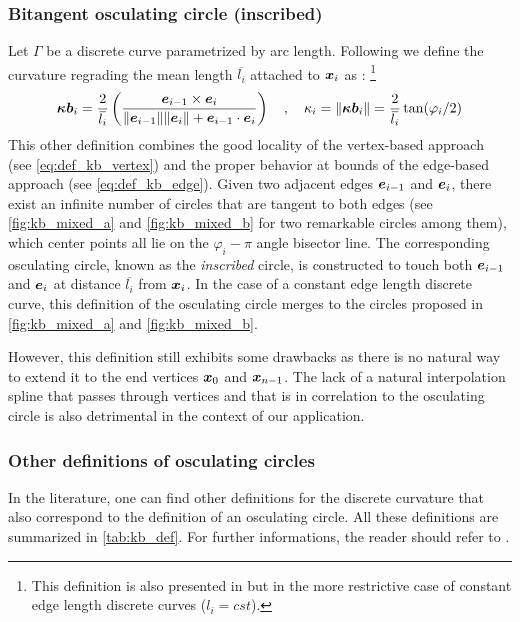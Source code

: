 \subsubsection{Bitangent osculating circle (inscribed)} \label{sec:inscribed}
Let $\Gamma$ be a discrete curve parametrized by arc length. Following \cite{Vouga2014} we define the curvature regrading the mean length $\overbar{l_i}$ attached to $\boldsymbol{x}_{i}$ as : \footnote{This definition is also presented in \cite{Bobenko2015, Carroll2014} but in the more restrictive case of constant edge length discrete curves ($l_i = cst$).}
\begin{equation}
	\vect{\kappa b}_i = \frac{2}{\overbar{l_i}} \left( \frac{\vect{e}_{i-1} \times \vect{e}_{i}}{\norm{\vect{e}_{i-1}} \norm{\vect{e}_{i}} + \vect{e}_{i-1} \cdot \vect{e}_{i}} \right)
	\quad , \quad
	\kappa_i = \norm{\vect{\kappa b}_i} = \frac{2}{\overbar{l_i}} \tan(\varphi_i/2)
\end{equation}
This other definition combines the good locality of the vertex-based approach (see \cref{eq:def_kb_vertex}) and the proper behavior at bounds of the edge-based approach (see \cref{eq:def_kb_edge}). Given two adjacent edges $\boldsymbol{e}_{i-1}$ and $\boldsymbol{e}_{i}$, there exist an infinite number of circles that are tangent to both edges (see \cref{fig:kb_mixed_a} and \cref{fig:kb_mixed_b} for two remarkable circles among them), which center points all lie on the $\varphi_i-\pi$ angle bisector line. The corresponding osculating circle, known as the \emph{inscribed} circle, is constructed to touch both $\boldsymbol{e}_{i-1}$ and $\boldsymbol{e}_{i}$ at distance $\overbar{l_i}$ from $\boldsymbol{x}_{i}$. In the case of a constant edge length discrete curve, this definition of the osculating circle merges to the circles proposed in \cref{fig:kb_mixed_a} and \cref{fig:kb_mixed_b}.

However, this definition still exhibits some drawbacks as there is no natural way to extend it to the end vertices $\boldsymbol{x}_{0}$ and $\boldsymbol{x}_{n-1}$. The lack of a natural interpolation spline that passes through vertices and that is in correlation to the osculating circle is also detrimental in the context of our application.

\subsubsection{Other definitions of osculating circles}
In the literature, one can find other definitions for the discrete curvature that also correspond to the definition of an osculating circle. All these definitions are summarized in \cref{tab:kb_def}. For further informations, the reader should refer to \cite{Carroll2014, Vouga2014, Bobenko2015, Romon2013}.

